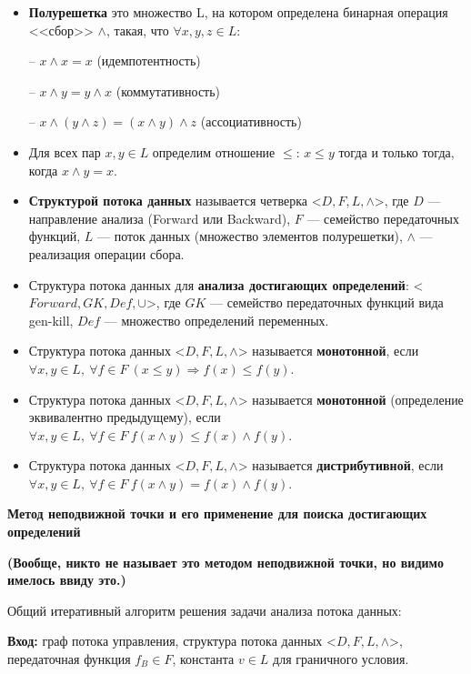 \begin{itemize}
    \item \textbf{Полурешетка} это множество L, на котором определена бинарная операция <<сбор>> $\land$, такая, что $\forall x, y, z \in L$:
    \item[--] $x \land x = x$ (идемпотентность)
    \item[--] $x \land y = y \land x$ (коммутативность)
    \item[--] $x \land (y \land z) = (x \land y) \land z$ (ассоциативность)
    
    \item Для всех пар $x, y \in L$ определим отношение $\leqslant$: $x \leqslant y$ тогда и только тогда, когда $x \land y = x$.

    \item \textbf{Структурой потока данных} называется четверка <$D, F, L, \land$>, где $D$ --- направление анализа (Forward или Backward), $F$ --- семейство передаточных функций, $L$ --- поток данных (множество элементов полурешетки), $\land$ --- реализация операции сбора.
    \item Структура потока данных для \textbf{анализа достигающих определений}: <$Forward, GK, Def, \cup $>, где $GK$ --- семейство передаточных функций вида gen-kill, $Def$ --- множество определений переменных.
    \item Структура потока данных <$D, F, L, \land$> называется \textbf{монотонной}, если $\forall x, y \in L,~\forall f \in F ~ (x \leqslant y) \Rightarrow f(x) \leqslant f(y)$.
    \item Структура потока данных <$D, F, L, \land$> называется \textbf{монотонной} (определение эквивалентно предыдущему), если $\forall x, y \in L,~\forall f \in F ~ f (x \land y) \leqslant f(x) \land f(y)$.
    \item Структура потока данных <$D, F, L, \land$> называется \textbf{дистрибутивной}, если $\forall x,y \in L,~\forall f \in F ~ f (x \land y) = f (x) \land f (y)$.
\end{itemize}

\textbf{Метод неподвижной точки и его применение для поиска достигающих определений}

\textbf{\textbf{(Вообще, никто не называет это методом неподвижной точки, но видимо имелось ввиду это.)}}

Общий итеративный алгоритм решения задачи анализа потока данных:

\textbf{Вход:} граф потока управления, структура потока данных <$D, F, L, \land$>, передаточная функция $f_B \in F$, константа $v \in L$ для граничного условия.

